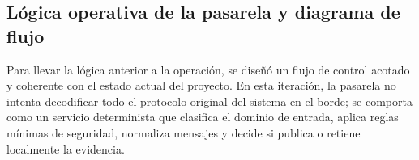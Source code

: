 \subsection{Lógica operativa de la pasarela y diagrama de flujo}
Para llevar la lógica anterior a la operación, se diseñó un flujo de control acotado y coherente con el estado actual del proyecto. En esta iteración, la pasarela no intenta decodificar todo el protocolo original del sistema en el borde; se comporta como un servicio determinista que clasifica el dominio de entrada, aplica reglas mínimas de seguridad, normaliza mensajes y decide si publica o retiene localmente la evidencia.


